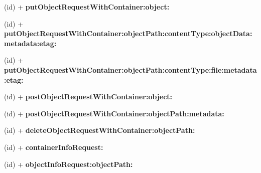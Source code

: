 \begin{DoxyCompactItemize}
\item 
\hypertarget{interface_a_s_i_cloud_files_object_request_ac9c57b5595d42ea6fdb13b9baa5ad073}{
(id) + {\bfseries put\-Object\-Request\-With\-Container\-:object\-:}}
\label{interface_a_s_i_cloud_files_object_request_ac9c57b5595d42ea6fdb13b9baa5ad073}

\item 
\hypertarget{interface_a_s_i_cloud_files_object_request_a51fd51b32cb64756aa6fbc3f50ff7df4}{
(id) + {\bfseries put\-Object\-Request\-With\-Container\-:object\-Path\-:content\-Type\-:object\-Data\-:metadata\-:etag\-:}}
\label{interface_a_s_i_cloud_files_object_request_a51fd51b32cb64756aa6fbc3f50ff7df4}

\item 
\hypertarget{interface_a_s_i_cloud_files_object_request_a4fd2c82bc1702341d5a482f7ff46db4b}{
(id) + {\bfseries put\-Object\-Request\-With\-Container\-:object\-Path\-:content\-Type\-:file\-:metadata\-:etag\-:}}
\label{interface_a_s_i_cloud_files_object_request_a4fd2c82bc1702341d5a482f7ff46db4b}

\item 
\hypertarget{interface_a_s_i_cloud_files_object_request_ae713a0e0f7867895b33210be74770c47}{
(id) + {\bfseries post\-Object\-Request\-With\-Container\-:object\-:}}
\label{interface_a_s_i_cloud_files_object_request_ae713a0e0f7867895b33210be74770c47}

\item 
\hypertarget{interface_a_s_i_cloud_files_object_request_a594d1d7c8fc812dc9acc2c862809b603}{
(id) + {\bfseries post\-Object\-Request\-With\-Container\-:object\-Path\-:metadata\-:}}
\label{interface_a_s_i_cloud_files_object_request_a594d1d7c8fc812dc9acc2c862809b603}

\item 
\hypertarget{interface_a_s_i_cloud_files_object_request_a55f1c9c4f71e7e3314b23d144b96fbac}{
(id) + {\bfseries delete\-Object\-Request\-With\-Container\-:object\-Path\-:}}
\label{interface_a_s_i_cloud_files_object_request_a55f1c9c4f71e7e3314b23d144b96fbac}

\item 
\hypertarget{interface_a_s_i_cloud_files_object_request_ab9af59ae6c15be52c702e45fca805db9}{
(id) + {\bfseries container\-Info\-Request\-:}}
\label{interface_a_s_i_cloud_files_object_request_ab9af59ae6c15be52c702e45fca805db9}

\item 
\hypertarget{interface_a_s_i_cloud_files_object_request_a4b4f0ea695cdec431818f4ca24a8a1cf}{
(id) + {\bfseries object\-Info\-Request\-:object\-Path\-:}}
\label{interface_a_s_i_cloud_files_object_request_a4b4f0ea695cdec431818f4ca24a8a1cf}


\end{DoxyCompactItemize}
